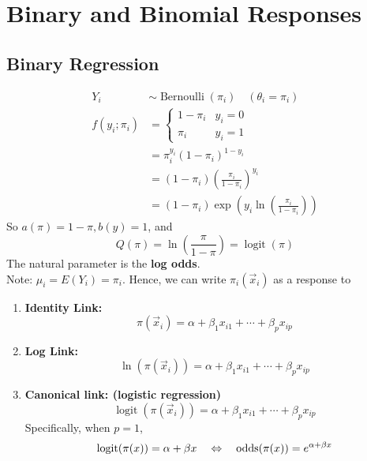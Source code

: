 \documentclass[11pt]{elegantbook}
\begin{document}
\section{Binary and Binomial Responses}
\subsection{Binary Regression}
\begin{example}
    \begin{equation}
        \begin{aligned}
        Y_i & \sim \operatorname{Bernoulli}\left(\pi_i\right) \quad\left(\theta_i=\pi_i\right) \\
        f\left(y_i ; \pi_i\right) & = \left\{\begin{matrix}
            1-\pi_i & y_i=0 \\
            \pi_i & y_i=1
        \end{matrix}\right.\\
        & =\pi_i^{y_i}\left(1-\pi_i\right)^{1-y_i} \\
        & =\left(1-\pi_i\right)\left(\frac{\pi_i}{1-\pi_i}\right)^{y_i} \\
        & =\left(1-\pi_i\right) \exp \left(y_i \ln \left(\frac{\pi_i}{1-\pi_i}\right)\right)
        \end{aligned}
        \nonumber
    \end{equation}
    So $a(\pi)=1-\pi, b(y)=1$, and
    $$
    Q(\pi)=\ln \left(\frac{\pi}{1-\pi}\right)=\operatorname{logit}(\pi)
    $$
    The natural parameter is the \textbf{log odds}.\\
    Note: $\mu_i=E\left(Y_i\right)=\pi_i$. Hence, we can write $\pi_i(\vec{x}_i)$ as a response to
    \begin{enumerate}[$\bullet$]
        \item \textbf{Identity Link:} $$\pi(\vec{x}_i)=\alpha+\beta_1 x_{i1} + \cdots + \beta_p x_{ip}$$
        \item \textbf{Log Link:} $$\ln (\pi(\vec{x}_i))=\alpha+\beta_1 x_{i1} + \cdots + \beta_p x_{ip}$$
        \item \textbf{Canonical link: (logistic regression)}
        $$
        \operatorname{logit}(\pi(\vec{x}_i))=\alpha+\beta_1 x_{i1} + \cdots + \beta_p x_{ip}
        $$
        Specifically, when $p=1$,
        \begin{equation}
            \begin{aligned}
                \operatorname{logit}(\pi(x))=\alpha+\beta x\quad &\Leftrightarrow\quad \textnormal{odds}(\pi(x))=e^{\alpha+\beta x}\\

\end{aligned}
\end{equation}
\end{enumerate}
\end{example}
\end{document}
